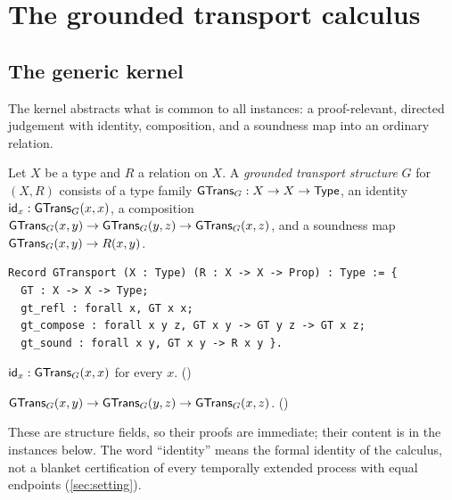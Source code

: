 \section{The grounded transport calculus}\label{sec:calculus}

\subsection{The generic kernel}
The kernel abstracts what is common to all instances: a proof-relevant, directed judgement with identity, composition, and a soundness map into an ordinary relation.

\begin{definition}
Let $X$ be a type and $R$ a relation on $X$. A \emph{grounded transport structure} $G$ for $(X,R)$ consists of a type family $\mathsf{GTrans}_G : X \to X \to \mathsf{Type}$, an identity $\mathsf{id}_x : \mathsf{GTrans}_G(x,x)$, a composition $\mathsf{GTrans}_G(x,y) \to \mathsf{GTrans}_G(y,z) \to \mathsf{GTrans}_G(x,z)$, and a soundness map $\mathsf{GTrans}_G(x,y) \to R(x,y)$.
\end{definition}

\begin{lstlisting}
Record GTransport (X : Type) (R : X -> X -> Prop) : Type := {
  GT : X -> X -> Type;
  gt_refl : forall x, GT x x;
  gt_compose : forall x y z, GT x y -> GT y z -> GT x z;
  gt_sound : forall x y, GT x y -> R x y }.
\end{lstlisting}

\begin{theorem}\label{thm:refl}
$\mathsf{id}_x : \mathsf{GTrans}_G(x,x)$ for every $x$. ()
\end{theorem}
\begin{theorem}\label{thm:compose}
$\mathsf{GTrans}_G(x,y) \to \mathsf{GTrans}_G(y,z) \to \mathsf{GTrans}_G(x,z)$. ()
\end{theorem}
These are structure fields, so their proofs are immediate; their content is in the instances below. The word ``identity'' means the formal identity of the calculus, not a blanket certification of every temporally extended process with equal endpoints (\cref{sec:setting}).

